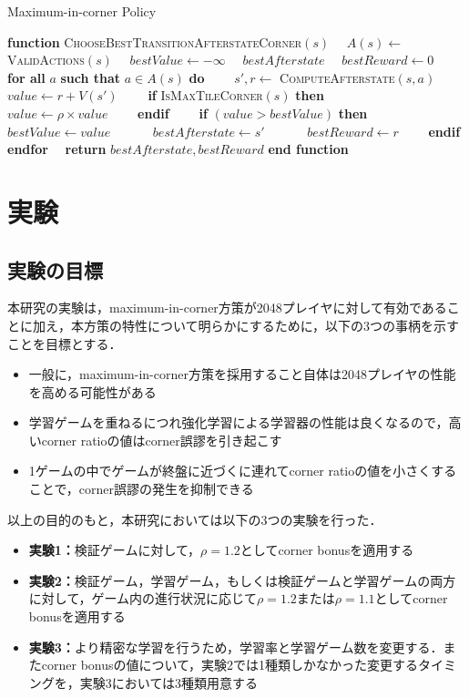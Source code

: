 \documentclass{suribt}
\begin{document}
\begin{algorithm}[t]
\caption{Maximum-in-corner Policy}
\label{alg3}
\begin{algorithmic}[1]
\STATE \textbf{function} \textsc{ChooseBestTransitionAfterstateCorner}$(s)$
\STATE 　$A(s) \leftarrow$ \textsc{ValidActions}$(s)$
\STATE 　$bestValue \leftarrow -\infty$
\STATE 　$bestAfterstate$ 
\STATE 　$bestReward \leftarrow 0$
\STATE 　\textbf{for all} $a$ \textbf{such that} $a \in A(s)$ \textbf{do}
\STATE 　　$s', r \leftarrow$ \textsc{ComputeAfterstate}$(s,a)$
\STATE 　　$value \leftarrow r + V(s')$
\STATE 　　\textbf{if} \textsc{IsMaxTileCorner}$(s)$ \textbf{then}
\STATE 　　　$value \leftarrow {\rho} \times value$
\STATE 　　\textbf{endif}
\STATE 　　\textbf{if} $(value > bestValue)$ \textbf{then}
\STATE 　　　$bestValue \leftarrow value$
\STATE 　　　$bestAfterstate \leftarrow s'$
\STATE 　　　$bestReward \leftarrow r$
\STATE 　　\textbf{endif}
\STATE 　\textbf{endfor}
\STATE 　\textbf{return} $bestAfterstate, bestReward$
\STATE \textbf{end function}
\end{algorithmic}
\end{algorithm}

\chapter{実験}

\section{実験の目標}
本研究の実験は，maximum-in-corner方策が2048プレイヤに対して有効であることに加え，本方策の特性について明らかにするために，以下の3つの事柄を示すことを目標とする．

\begin{itemize}
\item 一般に，maximum-in-corner方策を採用すること自体は2048プレイヤの性能を高める可能性がある
\item 学習ゲームを重ねるにつれ強化学習による学習器の性能は良くなるので，高いcorner ratioの値はcorner誤謬を引き起こす
\item 1ゲームの中でゲームが終盤に近づくに連れてcorner ratioの値を小さくすることで，corner誤謬の発生を抑制できる
\end{itemize}

以上の目的のもと，本研究においては以下の3つの実験を行った．

\begin{itemize}
\item \textbf{実験1：}検証ゲームに対して，${\rho}=1.2$としてcorner bonusを適用する
\item \textbf{実験2：}検証ゲーム，学習ゲーム，もしくは検証ゲームと学習ゲームの両方に対して，ゲーム内の進行状況に応じて${\rho}=1.2$または${\rho}=1.1$としてcorner bonusを適用する
\item \textbf{実験3：}より精密な学習を行うため，学習率と学習ゲーム数を変更する．またcorner bonusの値について，実験2では1種類しかなかった変更するタイミングを，実験3においては3種類用意する
\end{itemize}
\end{document}
